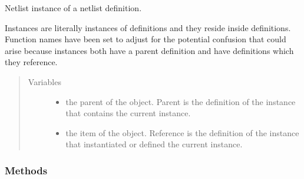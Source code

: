 \documentclass[letterpaper,10pt,english,openany,oneside]{sphinxmanual}
\begin{document}
\begin{fulllineitems}
\label{\detokenize{reference/classes/instance:spydrnet.Instance}}
Netlist instance of a netlist definition.

Instances are literally instances of definitions and they reside inside definitions.
Function names have been set to adjust for the potential confusion that could arise because instances both have a parent definition and have definitions which they reference.
\begin{quote}\begin{description}
\item[{Variables}] \leavevmode\begin{itemize}
\item {} 
{\hyperref[\detokenize{reference/classes/generated/spydrnet.Instance.parent:spydrnet.Instance.parent}]{}} \textendash{} the parent of the object. Parent is the definition of the instance that contains the current instance.

\item {} 
{\hyperref[\detokenize{reference/classes/generated/spydrnet.Instance.reference:spydrnet.Instance.reference}]{}} \textendash{} the item of the object. Reference is the definition of the instance that instantiated or defined the current instance.

\end{itemize}

\end{description}\end{quote}

\end{fulllineitems}



\subsubsection{Methods}
\label{\detokenize{reference/classes/instance:methods}}
\end{document}
